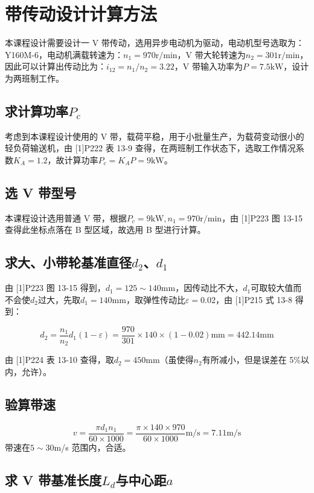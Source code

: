 \documentclass[12pt]{ctexart}
\begin{document}
\section{带传动设计计算方法}

本课程设计需要设计一 V 带传动，选用异步电动机为驱动，电动机型号选取为：Y160M-6，电动机满载转速为：$n_1 = 970\text{r/min}$，V 带大轮转速为$n_2=301\text{r/min}$，因此可以计算出传动比为：$i_{12}=n_1/n_2=3.22$，V 带输入功率为$P=7.5\text{kW}$，设计为两班制工作。

\subsection{求计算功率$P_c$}

考虑到本课程设计使用的 V 带，载荷平稳，用于小批量生产，为载荷变动很小的轻负荷输送机，由 [1]P222 表 13-9 查得，在两班制工作状态下，选取工作情况系数$K_A=1.2$，故计算功率$P_c=K_AP=9\text{kW}$。

\subsection{选 V 带型号}

本课程设计选用普通 V 带，根据$P_c=9\text{kW},n_1=970\text{r/min}$，由 [1]P223 图 13-15 查得此坐标点落在 B 型区域，故选用 B 型进行计算。

\subsection{求大、小带轮基准直径$d_2$、$d_1$}

由 [1]P223 图 13-15 得到，$d_1 = 125\sim 140\text{mm}$，因传动比不大，$d_1$可取较大值而不会使$d_2$过大，先取$d_1=140\text{mm}$，取弹性传动比$\varepsilon = 0.02$，由 [1]P215 式 13-8 得到：

$$d_2 = \frac{n_1}{n_2}d_1(1-\varepsilon)=\frac{970}{301}\times 140\times (1-0.02)\text{mm} = 442.14\text{mm}$$

由  [1]P224 表 13-10 查得，取$d_2=450\text{mm}$（虽使得$n_2$有所减小，但是误差在 5\%以内，允许）。

\subsection{验算带速}

$$v =\frac{\pi d_1n_1}{60\times 1000}=\frac{\pi \times 140 \times 970}{60\times 1000}\text{m/s}=7.11\text{m/s}$$带速在$5\sim 30$m/s 范围内，合适。

\subsection{求 V 带基准长度$L_d$与中心距$a$}
\end{document}
